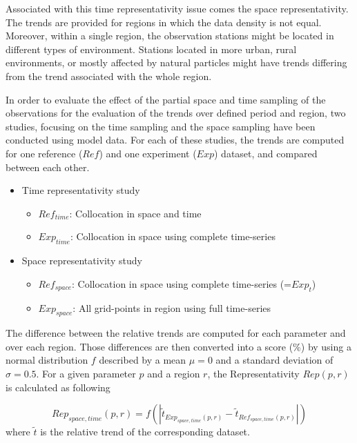 \documentclass[journal abbreviation, manuscript]{copernicus}
\begin{document}
Associated with this time representativity issue comes the space representativity. The trends are provided for regions in which the data density is not equal. Moreover, within a single region, the observation stations might be located in different types of environment. Stations located in more urban, rural environments, or mostly affected by natural particles might have trends differing from the trend associated with the whole region.

In order to evaluate the effect of the partial space and time sampling of the observations for the evaluation of the trends over defined period and region, two studies, focusing on the time sampling and the space sampling have been conducted using model data. For each of these studies, the trends are computed for one reference ($Ref$) and one experiment ($Exp$) dataset, and compared between each other.
\begin{itemize}
 \item Time representativity study
       \begin{itemize}
        \item $Ref_{time}$: Collocation in space and time
        \item $Exp_{time}$: Collocation in space using complete time-series
       \end{itemize}
 \item Space representativity study
       \begin{itemize}
        \item $Ref_{space}$: Collocation in space using complete time-series (=$Exp_{t}$)
        \item $Exp_{space}$: All grid-points in region using full time-series
       \end{itemize}
\end{itemize}

The difference between the relative trends are computed for each parameter and over each region. Those differences are then converted into a score (\unit{\%}) by using a normal distribution $f$ described by a mean $\mu=0$ and a standard deviation of $\sigma=0.5$. For a given parameter $p$ and a region $r$, the Representativity $Rep(p,r)$ is calculated as following

\begin{equation}
 Rep_{space,time}(p, r) = {f\left(\left| \tilde{t}_{Exp_{space,time}(p, r)}-\tilde{t}_{Ref_{space,time}(p, r)} \right|\right)}
\end{equation}
where $\tilde{t}$ is the relative trend of the corresponding dataset.
\end{document}
